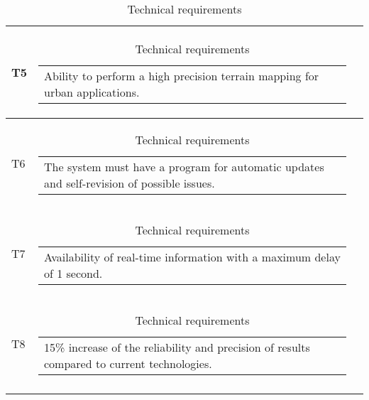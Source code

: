 \begin{longtable}[H]{l c c}
	T5 & \begin{tabular}[c]{@{}l@{}}\begin{minipage}[t]{\linewidth}
			Ability to perform a high precision terrain mapping for urban applications. \vspace{0.3cm}
	\end{minipage} \end{tabular}                                                                                                                                             \\  \midrule
	T6 & \begin{tabular}[c]{@{}l@{}}\begin{minipage}[t]{\linewidth}
			The system must have a program for automatic updates and self-revision of possible issues. \vspace{0.3cm}
	\end{minipage} \end{tabular}                                                                                                                                          \\  \midrule
	T7 & \begin{tabular}[c]{@{}l@{}}\begin{minipage}[t]{\linewidth}
			Availability of real-time information with a maximum delay of 1 second. \vspace{0.3cm}
	\end{minipage} \end{tabular}
	\\ \midrule
	T8 & \begin{tabular}[c]{@{}l@{}}\begin{minipage}[t]{\linewidth}
			15\% increase of the reliability and precision of results compared to current technologies. \vspace{0.3cm}
	\end{minipage} \end{tabular}                                                                                                                                             \\                                                                   	\bottomrule[2pt]
	\caption{Technical requirements}
\end{longtable}
